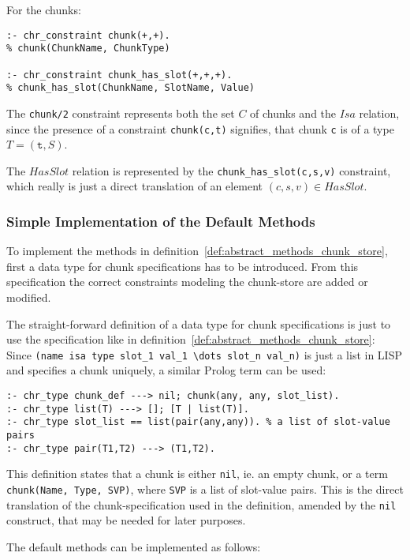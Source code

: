 For the chunks:

\begin{lstlisting}
:- chr_constraint chunk(+,+).
% chunk(ChunkName, ChunkType)

:- chr_constraint chunk_has_slot(+,+,+).
% chunk_has_slot(ChunkName, SlotName, Value)
\end{lstlisting}

The \verb|chunk/2| constraint represents both the set $C$ of chunks and the $Isa$ relation, since the presence of a constraint \verb|chunk(c,t)| signifies, that chunk \verb|c| is of a type $T = (\mathtt{t},S)$.

The $HasSlot$ relation is represented by the \verb|chunk_has_slot(c,s,v)| constraint, which really is just a direct translation of an element $(c,s,v) \in HasSlot$.

\subsubsection{Simple Implementation of the Default Methods}

To implement the methods in definition~\ref{def:abstract_methods_chunk_store}, first a data type for chunk specifications has to be introduced. From this specification the correct constraints modeling the chunk-store are added or modified.

The straight-forward definition of a data type for chunk specifications is just to use the specification like in definition~\ref{def:abstract_methods_chunk_store}: Since \verb|(name isa type slot_1 val_1 \dots slot_n val_n)| is just a list in LISP and specifies a chunk uniquely, a similar Prolog term can be used:

\begin{lstlisting}
:- chr_type chunk_def ---> nil; chunk(any, any, slot_list).
:- chr_type list(T) ---> []; [T | list(T)].
:- chr_type slot_list == list(pair(any,any)). % a list of slot-value pairs
:- chr_type pair(T1,T2) ---> (T1,T2).
\end{lstlisting}

This definition states that a chunk is either \verb|nil|, ie. an empty chunk, or a term \verb|chunk(Name, Type, SVP)|, where \verb|SVP| is a list of slot-value pairs. This is the direct translation of the chunk-specification used in the definition, amended by the \verb|nil| construct, that may be needed for later purposes.

The default methods can be implemented as follows:

\begin{lstlisting}[caption={rules for \texttt{add\_chunk}}]
 
\end{lstlisting}


